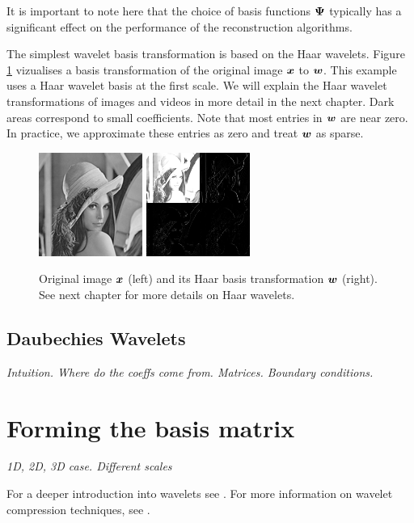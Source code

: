 It is important to note here that the choice of basis functions $\boldsymbol \Psi$ typically has a significant effect on the performance of the reconstruction algorithms.

The simplest wavelet basis transformation is based on the Haar wavelets.
Figure \ref{fig:haarlenna} vizualises a basis transformation of the original image $\boldsymbol x$ to $\boldsymbol w$. 
This example uses a Haar wavelet basis at the first scale.
We will explain the Haar wavelet transformations of images and videos in more detail in the next chapter.
Dark areas correspond to small coefficients.
Note that most entries in $\boldsymbol w$ are near zero. 
In practice, we approximate these entries as zero and treat $\boldsymbol w$ as sparse.

\begin{figure}
\center
\includegraphics{Images/128.png}
\includegraphics{Images/haar.png}
\caption{Original image $\boldsymbol x$ (left) and its Haar basis transformation $\boldsymbol w$ (right). See next chapter for more details on Haar wavelets.}
\label{fig:haarlenna}
\end{figure}

\subsection{Daubechies Wavelets}
\emph{Intuition. Where do the coeffs come from. Matrices. Boundary conditions.}


\section{Forming the basis matrix}
\emph{1D, 2D, 3D case. Different scales}

For a deeper introduction into wavelets see \cite{stollnitz1995}.
For more information on wavelet compression techniques, see \cite{devore1992}.

